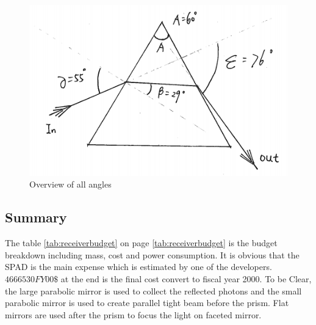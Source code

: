 \begin{figure}[ht!]
\centering
\includegraphics[scale = 0.8]{chapters/img/prism_final.png}
\caption{Overview of all angles}
\label{fig:prism_final}
\end{figure}

\subsection{Summary}
\label{sum}
The table \ref{tab:receiverbudget} on page \ref{tab:receiverbudget} is the budget breakdown including mass, cost and power consumption. It is obvious that the \acs{SPAD} is the main expense which is estimated by one of the developers. $4666530 FY00\$$ at the end is the final cost convert to fiscal year 2000. To be Clear, the large parabolic mirror is used to collect the reflected photons and the small parabolic mirror is used to create parallel tight beam before the prism. Flat mirrors are used after the prism to focus the light on faceted mirror.

